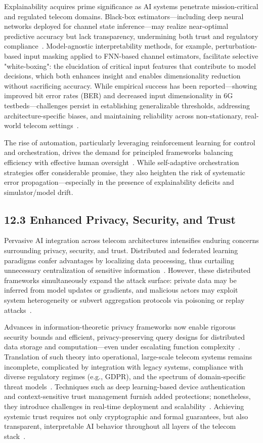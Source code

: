\documentclass[11pt]{article}
\begin{document}
Explainability acquires prime significance as AI systems penetrate mission-critical and regulated telecom domains. Black-box estimators—including deep neural networks deployed for channel state inference—may realize near-optimal predictive accuracy but lack transparency, undermining both trust and regulatory compliance~\cite{38}. Model-agnostic interpretability methods, for example, perturbation-based input masking applied to FNN-based channel estimators, facilitate selective "white-boxing": the elucidation of critical input features that contribute to model decisions, which both enhances insight and enables dimensionality reduction without sacrificing accuracy. While empirical success has been reported—showing improved bit error rates (BER) and decreased input dimensionality in 6G testbeds—challenges persist in establishing generalizable thresholds, addressing architecture-specific biases, and maintaining reliability across non-stationary, real-world telecom settings~\cite{38,41}.

The rise of automation, particularly leveraging reinforcement learning for control and orchestration, drives the demand for principled frameworks balancing efficiency with effective human oversight~\cite{37}. While self-adaptive orchestration strategies offer considerable promise, they also heighten the risk of systematic error propagation—especially in the presence of explainability deficits and simulator/model drift.

\subsection{12.3 Enhanced Privacy, Security, and Trust}

Pervasive AI integration across telecom architectures intensifies enduring concerns surrounding privacy, security, and trust. Distributed and federated learning paradigms confer advantages by localizing data processing, thus curtailing unnecessary centralization of sensitive information~\cite{17,18,19,23,24,26,48}. However, these distributed frameworks simultaneously expand the attack surface: private data may be inferred from model updates or gradients, and malicious actors may exploit system heterogeneity or subvert aggregation protocols via poisoning or replay attacks~\cite{10,20,21,23}.

Advances in information-theoretic privacy frameworks now enable rigorous security bounds and efficient, privacy-preserving query designs for distributed data storage and computation—even under escalating function complexity~\cite{48}. Translation of such theory into operational, large-scale telecom systems remains incomplete, complicated by integration with legacy systems, compliance with diverse regulatory regimes (e.g., GDPR), and the spectrum of domain-specific threat models~\cite{10,24,49}. Techniques such as deep learning-based device authentication and context-sensitive trust management furnish added protections; nonetheless, they introduce challenges in real-time deployment and scalability~\cite{18,23}. Achieving systemic trust requires not only cryptographic and formal guarantees, but also transparent, interpretable AI behavior throughout all layers of the telecom stack~\cite{19,26,49}.
\end{document}
